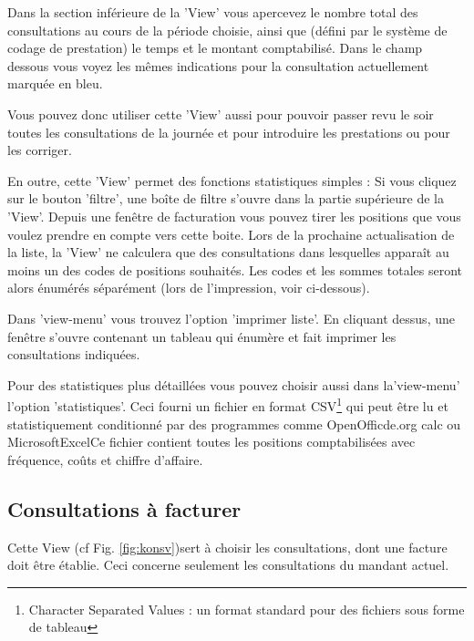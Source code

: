\medskip

Dans la section inférieure de la 'View' vous apercevez le nombre total des consultations au cours de la période choisie, ainsi que (défini par le système de codage de prestation) le temps et le montant comptabilisé. Dans le champ dessous vous voyez les mêmes indications pour la consultation actuellement marquée en bleu.

Vous pouvez donc utiliser cette 'View' aussi pour pouvoir passer revu le soir
toutes les consultations de la journée et pour introduire les prestations ou pour les corriger.


\medskip

En outre, cette 'View' permet des fonctions statistiques simples :
Si vous cliquez sur le bouton 'filtre', une boîte de filtre s'ouvre dans la partie supérieure de la 'View'. Depuis une fenêtre de facturation vous pouvez tirer les positions que vous voulez prendre en compte vers cette boite. Lors de la prochaine actualisation de la liste, la 'View' ne calculera que des consultations dans lesquelles apparaît au moins un des codes de positions souhaités. Les codes et les sommes totales seront alors énumérés séparément (lors de l'impression, voir ci-dessous).

\medskip

Dans 'view-menu' vous trouvez l'option 'imprimer liste'. En cliquant dessus, une fenêtre s'ouvre contenant un tableau qui énumère et fait imprimer les consultations indiquées.

\medskip

Pour des statistiques plus détaillées vous pouvez choisir aussi dans la'view-menu' l'option 'statistiques'. Ceci fourni un fichier en format CSV\footnote{Character Separated Values : un format standard pour des fichiers sous forme de tableau} qui peut être lu et statistiquement conditionné par des programmes comme OpenOfficde.org calc ou Microsoft\texttrademark Excel\texttrademark Ce fichier contient toutes les positions comptabilisées avec fréquence, coûts et chiffre d'affaire.


\subsection{Consultations à facturer}
 Cette View (cf Fig. \ref{fig:konsv})sert à choisir les consultations, dont une facture doit être établie.
Ceci concerne seulement les consultations du mandant actuel.

